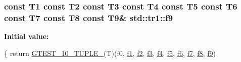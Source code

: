\subsubsection[{\texorpdfstring{f9}{f9}}]{\setlength{\rightskip}{0pt plus 5cm}const T1 const T2 const T3 const T4 const T5 const T6 const T7 const T8 const T9\& std\+::tr1\+::f9}\hypertarget{namespacestd_1_1tr1_a216d2c7cdfaaf415caba2f88e2c34413}{}\label{namespacestd_1_1tr1_a216d2c7cdfaaf415caba2f88e2c34413}
{\bfseries Initial value\+:}
\begin{DoxyCode}
\{
  \textcolor{keywordflow}{return} \hyperlink{gtest-tuple_8h_a275e7bcd84299cc44b9c1dba971951c4}{GTEST\_10\_TUPLE\_}(T)(f0, \hyperlink{namespacestd_1_1tr1_a9c0fa65b105f8e2f58ba59ecf75fd000}{f1}, \hyperlink{namespacestd_1_1tr1_a87dd9e009868361317f587126dba63d4}{f2}, \hyperlink{namespacestd_1_1tr1_a0f7c3b47d27d42d82d1a333ea420ce4e}{f3}, \hyperlink{namespacestd_1_1tr1_adc796e02b7385d526aff708189564f67}{f4}, \hyperlink{namespacestd_1_1tr1_a9c1eb66b2b2fa321942af95405232a0d}{f5}, \hyperlink{namespacestd_1_1tr1_a6b62f32e1e3e21bceb94eb46c4cbfd56}{f6}, 
      \hyperlink{namespacestd_1_1tr1_a2185f3a1c07f2df072c39cb91ffa89a4}{f7}, \hyperlink{namespacestd_1_1tr1_ab998afa41cea8d6d26d7e4288b0bf974}{f8}, \hyperlink{namespacestd_1_1tr1_a216d2c7cdfaaf415caba2f88e2c34413}{f9})
\end{DoxyCode}
